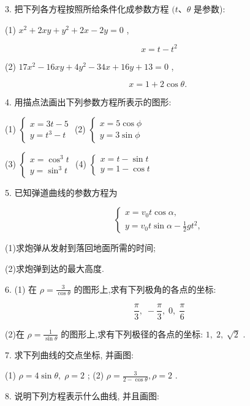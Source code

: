 \documentclass[lang=cn,newtx,10pt,scheme=chinese]{elegantbook}
\begin{document}
3. 把下列各方程按照所给条件化成参数方程 \((t\text{、}\theta\) 是参数):

(1) \({x}^{2} + {2xy} + {y}^{2} + {2x} - {2y} = 0\) ,

\[
  x = t - {t}^{2}
\]

(2) \({17}{x}^{2} - {16xy} + 4{y}^{2} - {34x} + {16y} + {13} = 0\) ,

\[
  x = 1 + 2\cos \theta \text{. }
\]

4. 用描点法画出下列参数方程所表示的图形:

(1) \(\left\{ \begin{array}{l} x = {3t} - 5 \\ y = {t}^{3} - t \end{array}\right.\) (2) \(\left\{ \begin{array}{l} x = 5\cos \phi \\ y = 3\sin \phi \end{array}\right.\)

(3) \(\left\{ \begin{array}{l} x = {\cos }^{3}t \\ y = {\sin }^{3}t \end{array}\right.\) (4) \(\left\{ \begin{array}{l} x = t - \sin t \\ y = 1 - \cos t \end{array}\right.\)

5. 已知弹道曲线的参数方程为

\[
  \left\{ \begin{array}{l} x = {v}_{0}t\cos \alpha , \\ y = {v}_{0}t\sin \alpha - \frac{1}{2}g{t}^{2}, \end{array}\right.
\]

(1)求炮弹从发射到落回地面所需的时间;

(2)求炮弹到达的最大高度.

6. (1) 在 \(\rho = \frac{3}{\cos \theta }\) 的图形上,求有下列极角的各点的坐标:

\[
  \frac{\pi }{3},\; - \frac{\pi }{3},\;0,\;\frac{\pi }{6}
\]

(2)在 \(\rho = \frac{1}{\sin \theta }\) 的图形上,求有下列极径的各点的坐标: \(1,\;2,\;\sqrt{2}\) .

7. 求下列曲线的交点坐标, 并画图:

(1) \(\rho = 4\sin \theta ,\;\rho = 2\) ; (2) \(\rho = \frac{3}{2 - \cos \theta },\rho = 2\) .

8. 说明下列方程表示什么曲线, 并且画图:
\end{document}
